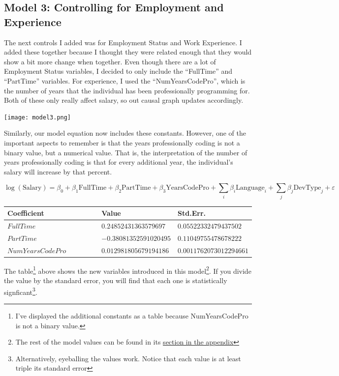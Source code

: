 \documentclass{report}
\begin{document}
\subsection{Model 3: Controlling for Employment and Experience}

The next controls I added was for Employment Status and Work Experience. I added these together because I thought they were related enough that they would show a bit more change when together. Even though there are a lot of Employment Status variables, I decided to only include the ``FullTime'' and ``PartTime'' variables. For experience, I used the ``NumYearsCodePro'', which is the number of years that the individual has been professionally programming for. Both of these only really affect salary, so out causal graph updates accordingly.

\texttt{[image: model3.png]}

Similarly, our model equation now includes these constants. However, one of the important aspects to remember is that the years professionally coding is not a binary value, but a numerical value. That is, the interpretation of the number of years professionally coding is that for every additional year, the individual's salary will increase by that percent.

$$\log({\text{Salary}}) = \beta_0 + \beta_1 \text{FullTime} + \beta_2 \text{PartTime} + \beta_3 \text{YearsCodePro} + \sum_i{\beta_i \text{Language}_i} + \sum_j{\beta_j \text{DevType}_j} + \varepsilon$$

\begin{longtable}{|R{0.4\linewidth}|R{0.3\linewidth}|R{0.3\linewidth}|}
  \hline
  \textbf{Coefficient} & \textbf{Value} & \textbf{Std.Err.} \\
  \hline
  $FullTime$ & $0.24852431363579697$ & $0.05522332479437502$\\
  \hline
  $PartTime$ & $-0.38081352591020495$ & $0.11049755478678222$\\
  \hline
  $NumYearsCodePro$ & $0.012981805679194186$ & $0.0011762073012294661$ \\
  \hline
\end{longtable}

The table\footnote{I've displayed the additional constants as a table because NumYearsCodePro is not a binary value.} above shows the new variables introduced in this model\footnote{The rest of the model values can be found in its \hyperref[data:model3]{section in the appendix}}. If you divide the value by the standard error, you will find that each one is statistically signficant\footnote{Alternatively, eyeballing the values work. Notice that each value is at least triple its standard error}.
\end{document}

